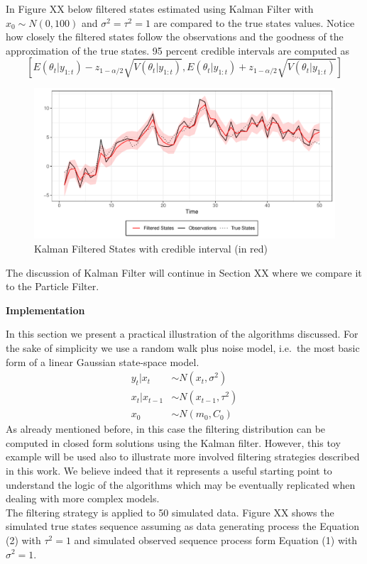 \documentclass[
]{book}
\theoremstyle{break}
\theoremstyle{nonumberplain}
\begin{document}
In Figure XX below filtered states estimated using Kalman Filter with
\(x_{0} \sim N(0,100)\) and \(\sigma^{2}=\tau^{2}=1\) are compared to
the true states values. Notice how closely the filtered states follow
the observations and the goodness of the approximation of the true
states. 95 percent credible intervals are computed as
\[[E(\theta_{t}|y_{1:t})-z_{1-\alpha/2}\sqrt{V(\theta_{t}|y_{1:t})},E(\theta_{t}|y_{1:t})+z_{1-\alpha/2}\sqrt{V(\theta_{t}|y_{1:t})}]\]

\begin{figure}[H]

{\centering \includegraphics{final-draft_files/figure-latex/unnamed-chunk-7-1} 

}

\caption{Kalman Filtered States with credible interval (in red)}\label{fig:unnamed-chunk-7}
\end{figure}

The discussion of Kalman Filter will continue in Section XX where we
compare it to the Particle Filter.

\textbf{Implementation}

In this section we present a practical illustration of the algorithms
discussed. For the sake of simplicity we use a random walk plus noise
model, i.e.~the most basic form of a linear Gaussian state-space model.
\begin{align}
y_{t}|x_{t} & \sim N(x_{t},\sigma^{2}) \\
x_{t}|x_{t-1} & \sim N(x_{t-1},\tau^{2}) \\
x_{0} & \sim N(m_{0},C_{0})
\end{align} As already mentioned before, in this case the filtering
distribution can be computed in closed form solutions using the Kalman
filter. However, this toy example will be used also to illustrate more
involved filtering strategies described in this work. We believe indeed
that it represents a useful starting point to understand the logic of
the algorithms which may be eventually replicated when dealing with more
complex models.\\
The filtering strategy is applied to 50 simulated data. Figure XX shows
the simulated true states sequence assuming as data generating process
the Equation (2) with \(\tau^{2}=1\) and simulated observed sequence
process form Equation (1) with \(\sigma^{2}=1\).
\end{document}
